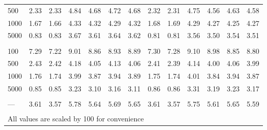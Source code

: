 \documentclass[AMA,STIX1COL,doublespace]{WileyNJD-v2}
\begin{document}
\begin{table}
\begin{tabular}[t]{lcccccccccccc}
\hspace{1em}500 & 2.33 & 2.33 & 4.84 & 4.68 & 4.72 & 4.68 & 2.32 & 2.31 & 4.75 & 4.56 & 4.63 & 4.58\\
\hspace{1em}1000 & 1.67 & 1.66 & 4.33 & 4.32 & 4.29 & 4.32 & 1.68 & 1.69 & 4.29 & 4.27 & 4.25 & 4.27\\
\hspace{1em}5000 & 0.83 & 0.83 & 3.67 & 3.61 & 3.64 & 3.62 & 0.81 & 0.81 & 3.56 & 3.50 & 3.54 & 3.51\\
\addlinespace[0.75em]
\multicolumn{13}{l}{\textbf{10 predictors, 490 junk}}\\
\hline
\hspace{1em}100 & 7.29 & 7.22 & 9.01 & 8.86 & 8.93 & 8.89 & 7.30 & 7.28 & 9.10 & 8.98 & 8.85 & 8.80\\
\hspace{1em}500 & 2.43 & 2.42 & 4.18 & 4.05 & 4.13 & 4.06 & 2.41 & 2.39 & 4.14 & 4.00 & 4.06 & 3.99\\
\hspace{1em}1000 & 1.76 & 1.74 & 3.99 & 3.87 & 3.94 & 3.89 & 1.75 & 1.74 & 4.01 & 3.84 & 3.94 & 3.87\\
\hspace{1em}5000 & 0.85 & 0.85 & 3.23 & 3.10 & 3.16 & 3.11 & 0.86 & 0.86 & 3.31 & 3.19 & 3.23 & 3.17\\
\addlinespace[0.75em]
\multicolumn{13}{l}{\textbf{Overall}}\\
\hline
\hspace{1em}--- & 3.61 & 3.57 & 5.78 & 5.64 & 5.69 & 5.65 & 3.61 & 3.57 & 5.75 & 5.61 & 5.65 & 5.59\\
\bottomrule
\multicolumn{13}{l}{\textsuperscript{} All values are scaled by 100 for convenience}\\
\end{tabular}
\end{table}
\end{document}
